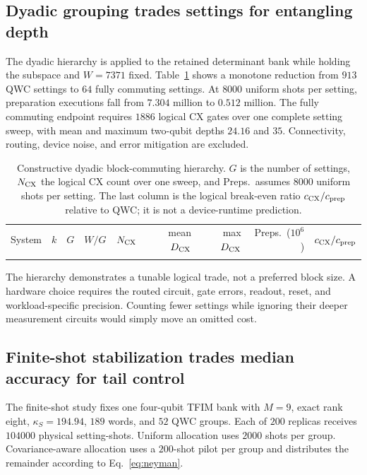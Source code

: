 \documentclass[aps,pra,reprint,superscriptaddress,nofootinbib,floatfix]{revtex4-2}
\begin{document}
\subsection{Dyadic grouping trades settings for entangling depth}
\label{sec:results-dyadic}

The dyadic hierarchy is applied to the retained determinant bank while holding
the subspace and \(W=7371\) fixed.  Table~\ref{tab:dyadic} shows a monotone
reduction from \(913\) QWC settings to \(64\) fully commuting settings.
At \(8000\) uniform shots per setting, preparation executions fall from
\(7.304\) million to \(0.512\) million.  The fully commuting endpoint requires
\(1886\) logical CX gates over one complete setting sweep, with mean and
maximum two-qubit depths \(24.16\) and \(35\).  Connectivity, routing, device
noise, and error mitigation are excluded.

\begin{table}[t]
\caption{Constructive dyadic block-commuting hierarchy.  \(G\) is the number
of settings, \(N_{\rm CX}\) the logical CX count over one sweep, and Preps.\
assumes \(8000\) uniform shots per setting.  The last column is the logical
break-even ratio \(c_{\rm CX}/c_{\rm prep}\) relative to QWC; it is not a
device-runtime prediction.}
\label{tab:dyadic}
\scriptsize
\begin{ruledtabular}
\begin{tabular}{llrrrrrrr}
System & \(k\) & \(G\) & \(W/G\) & \(N_{\rm CX}\) & mean \(D_{\rm CX}\) & max \(D_{\rm CX}\) & Preps.\ (\(10^6\)) & \(c_{\rm CX}/c_{\rm prep}\) \\
\colrule

\end{tabular}
\end{ruledtabular}
\end{table}

The hierarchy demonstrates a tunable logical trade, not a preferred block
size.  A hardware choice requires the routed circuit, gate errors, readout,
reset, and workload-specific precision.  Counting fewer settings while
ignoring their deeper measurement circuits would simply move an omitted cost.

\subsection{Finite-shot stabilization trades median accuracy for tail control}
\label{sec:results-finite-shot}

The finite-shot study fixes one four-qubit TFIM bank with \(M=9\), exact rank
eight, \(\kappa_S=194.94\), \(189\) words, and \(52\) QWC groups.  Each of
\(200\) replicas receives \(104000\) physical setting-shots.  Uniform
allocation uses \(2000\) shots per group.  Covariance-aware allocation uses a
\(200\)-shot pilot per group and distributes the remainder according to
Eq.~\eqref{eq:neyman}.
\end{document}
